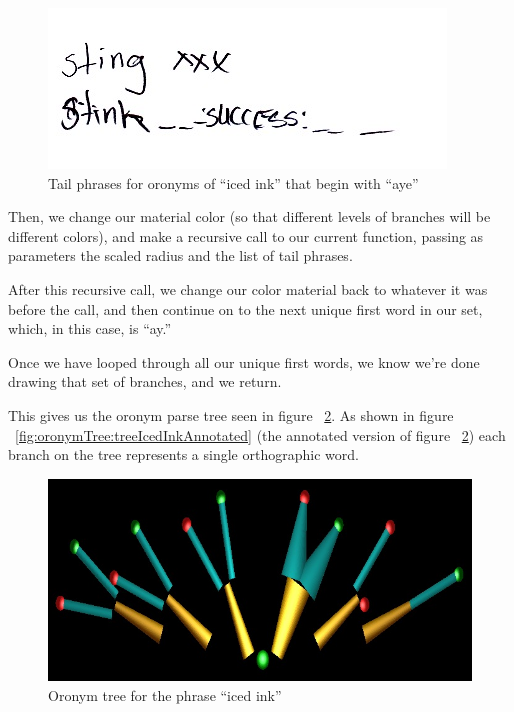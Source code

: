 \begin{figure}[ht]
\begin{center}
\includegraphics[width=.5\textwidth]{Fig3_3_9_TailPhrasesForAye.jpg}
\captionfonts
\caption[Tail Phrases for aye]{Tail phrases for oronyms of ``iced ink'' that begin with ``aye''}
\label{fig:oronymTree:TailPhrasesForAye}
\end{center}
\end{figure}

Then, we change our material color (so that different levels of branches will be different colors), and make a recursive call to our current function, passing as parameters the scaled radius and the list of tail phrases.

After this recursive call, we change our color material back to whatever it was before the call, and then continue on to the next unique first word in our set, which, in this case, is ``ay.''

Once we have looped through all our unique first words, we know we're done drawing that set of branches, and we return.  

This gives us the oronym parse tree seen in figure ~\ref{fig:oronymTree:treeIcedInk}.  As shown in figure ~\ref{fig:oronymTree:treeIcedInkAnnotated} (the annotated version of figure ~\ref{fig:oronymTree:treeIcedInk}) each branch on the tree represents a single orthographic word.

\begin{figure}[ht]
\begin{center}
\includegraphics[width=.5\textwidth]{OronymTree_blackbg_IcedInk.jpg}
\captionfonts
\caption[Oronym tree for the phrase iced ink]{Oronym tree for the phrase ``iced ink''}
\label{fig:oronymTree:treeIcedInk}
\end{center}
\end{figure}


